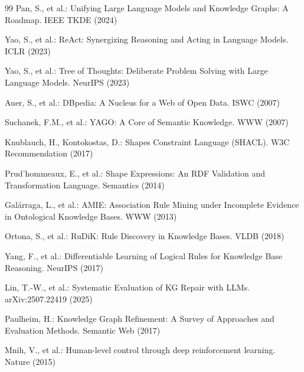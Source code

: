 \documentclass[runningheads]{llncs}
\begin{document}
\begin{thebibliography}{99}
Pan, S., et al.: Unifying Large Language Models and Knowledge Graphs: A Roadmap. IEEE TKDE (2024)

Yao, S., et al.: ReAct: Synergizing Reasoning and Acting in Language Models. ICLR (2023)

Yao, S., et al.: Tree of Thoughts: Deliberate Problem Solving with Large Language Models. NeurIPS (2023)

Auer, S., et al.: DBpedia: A Nucleus for a Web of Open Data. ISWC (2007)

Suchanek, F.M., et al.: YAGO: A Core of Semantic Knowledge. WWW (2007)

Knublauch, H., Kontokostas, D.: Shapes Constraint Language (SHACL). W3C Recommendation (2017)

Prud'hommeaux, E., et al.: Shape Expressions: An RDF Validation and Transformation Language. Semantics (2014)

Galárraga, L., et al.: AMIE: Association Rule Mining under Incomplete Evidence in Ontological Knowledge Bases. WWW (2013)

Ortona, S., et al.: RuDiK: Rule Discovery in Knowledge Bases. VLDB (2018)

Yang, F., et al.: Differentiable Learning of Logical Rules for Knowledge Base Reasoning. NeurIPS (2017)

Lin, T.-W., et al.: Systematic Evaluation of KG Repair with LLMs. arXiv:2507.22419 (2025)

Paulheim, H.: Knowledge Graph Refinement: A Survey of Approaches and Evaluation Methods. Semantic Web (2017)

Mnih, V., et al.: Human-level control through deep reinforcement learning. Nature (2015)
\end{thebibliography}
\end{document}
